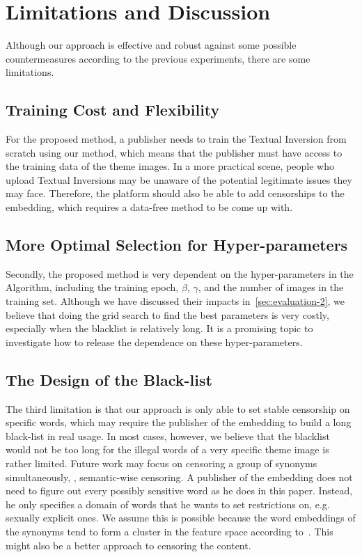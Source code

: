 \section{Limitations and Discussion}
\label{sec:Discussion}
Although our approach is effective and robust against some possible countermeasures according to the previous experiments, there are some limitations.

\subsection{Training Cost and Flexibility}
For the proposed method, a publisher needs to train the Textual Inversion from scratch using our method, which means that the publisher must have access to the training data of the theme images. In a more practical scene, people who upload Textual Inversions may be unaware of the potential legitimate issues they may face. Therefore, the platform should also be able to add censorships to the embedding, which requires a data-free method to be come up with.

\subsection{More Optimal Selection for Hyper-parameters}
Secondly, the proposed method is very dependent on the hyper-parameters in the Algorithm, including the training epoch, $\beta$, $\gamma$, and the number of images in the training set. Although we have discussed their impacts in~\cref{sec:evaluation-2}, we believe that doing the grid search to find the best parameters is very costly, especially when the blacklist is relatively long. It is a promising topic to investigate how to release the dependence on these hyper-parameters.


\subsection{The Design of the Black-list}
The third limitation is that our approach is only able to set stable censorship on specific words, which may require the publisher of the embedding to build a long black-list in real usage. In most cases, however, we believe that the blacklist would not be too long for the illegal words of a very specific theme image is rather limited. Future work may focus on censoring a group of synonyms simultaneously, \ie, semantic-wise censoring. A publisher of the embedding does not need to figure out every possibly sensitive word as he does in this paper. Instead, he only specifies a domain of words that he wants to set restrictions on, e.g. sexually explicit ones. We assume this is possible because the word embeddings of the synonyms tend to form a cluster in the feature space according to~\cite{word2vec}. This might also be a better approach to censoring the content.


